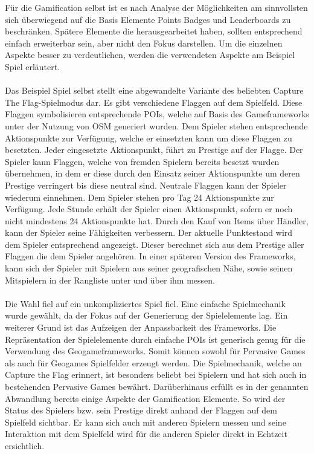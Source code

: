 Für die Gamification selbst ist es nach Analyse der Möglichkeiten am sinnvollsten sich überwiegend auf die Basis Elemente Points Badges und Leaderboards zu beschränken. Spätere Elemente die \textcite{Zichermann.2011} herausgearbeitet haben, sollten entsprechend einfach erweiterbar sein, aber nicht den Fokus darstellen. Um die einzelnen Aspekte besser zu verdeutlichen, werden die verwendeten Aspekte am Beispiel Spiel erläutert.
\\\\
Das Beispiel Spiel selbst stellt eine abgewandelte Variante des beliebten Capture The Flag-Spielmodus dar.\cite{Atkin.1999}
Es gibt verschiedene Flaggen auf dem Spielfeld. Diese Flaggen symbolisieren entsprechende POIs, welche auf Basis des Gameframeworks unter der Nutzung von OSM generiert wurden. Dem Spieler stehen entsprechende Aktionspunkte zur Verfügung, welche er einsetzten kann um diese Flaggen zu besetzten. Jeder eingesetzte Aktionspunkt, führt zu \glqq Prestige\grqq{} auf der Flagge. Der Spieler kann Flaggen, welche von fremden Spielern bereits besetzt wurden übernehmen, in dem er diese durch den Einsatz seiner Aktionspunkte um deren Prestige verringert bis diese neutral sind. Neutrale Flaggen kann der Spieler wiederum einnehmen. Dem Spieler stehen pro Tag 24 Aktionspunkte zur Verfügung. Jede Stunde erhält der Spieler einen Aktionspunkt, sofern er noch nicht mindestens 24 Aktionspunkte hat. Durch den Kauf von Items über Händler, kann der Spieler seine Fähigkeiten verbessern. Der aktuelle Punktestand wird dem Spieler entsprechend angezeigt.
Dieser berechnet sich aus dem Prestige aller Flaggen die dem Spieler angehören. 
In einer späteren Version des Frameworks,  kann sich der Spieler mit Spielern aus seiner geografischen Nähe, sowie seinen Mitspielern in der Rangliste unter und über ihm messen.
\\\\
Die Wahl fiel auf ein unkompliziertes Spiel fiel. Eine einfache Spielmechanik wurde gewählt, da der Fokus auf der Generierung der Spielelemente lag. Ein weiterer Grund ist das Aufzeigen der Anpassbarkeit des Frameworks. Die Repräsentation der Spielelemente durch einfache POIs ist generisch genug für die Verwendung des Geogameframeworks. Somit können sowohl für Pervasive Games als auch für Geogames Spielfelder erzeugt werden. Die Spielmechanik, welche an Capture the Flag erinnert, ist besonders beliebt bei Spielern und hat sich auch in bestehenden Pervasive Games bewährt.\cite{Bell.2006,Ingress.2014} Darüberhinaus erfüllt es in der genannten Abwandlung bereits einige Aspekte der Gamification Elemente. So wird der Status des Spielers bzw. sein \glqq Prestige\grqq{} direkt anhand der Flaggen auf dem Spielfeld sichtbar. Er kann sich auch mit anderen Spielern messen und seine Interaktion mit dem Spielfeld wird für die anderen Spieler direkt in Echtzeit ersichtlich.
